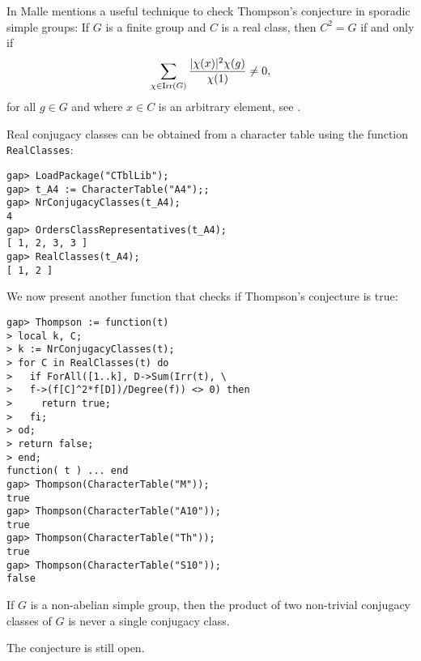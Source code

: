 \begin{example}
    In \cite{MR3289286} 
    Malle mentions a useful technique 
    to check Thompson's conjecture in sporadic simple groups: If $G$
    is a finite group and $C$ is a real class, then
    $C^2=G$ if and only if
    \[
        \sum_{\chi\in\operatorname{Irr}(G)}\frac{|\chi(x)|^2\chi(g)}{\chi(1)}\ne0,
    \]
    for all $g\in G$ and where $x\in C$ is an arbitrary element, 
    see \cite[Exercise 2.6.3]{MR2680716}. 
    
    Real conjugacy classes 
    can be obtained from a character table
    using the function \lstinline{RealClasses}:
\begin{lstlisting}
gap> LoadPackage("CTblLib");
gap> t_A4 := CharacterTable("A4");;
gap> NrConjugacyClasses(t_A4);
4
gap> OrdersClassRepresentatives(t_A4);
[ 1, 2, 3, 3 ]
gap> RealClasses(t_A4);
[ 1, 2 ]
\end{lstlisting}
    We now present another function that checks 
    if Thompson's conjecture is true:
\begin{lstlisting}
gap> Thompson := function(t)
> local k, C;
> k := NrConjugacyClasses(t);
> for C in RealClasses(t) do
>   if ForAll([1..k], D->Sum(Irr(t), \ 
>   f->(f[C]^2*f[D])/Degree(f)) <> 0) then
>     return true;
>   fi;
> od;
> return false;
> end;
function( t ) ... end
gap> Thompson(CharacterTable("M"));
true
gap> Thompson(CharacterTable("A10"));
true
gap> Thompson(CharacterTable("Th"));
true
gap> Thompson(CharacterTable("S10"));
false
\end{lstlisting}
\end{example}

\begin{conjecture}
\label{conj:AradHerzog}
If $G$ is a non-abelian simple group, then 
the product of two non-trivial conjugacy classes of $G$ 
is never a single conjugacy class. 
\end{conjecture}

The conjecture is still open. 

